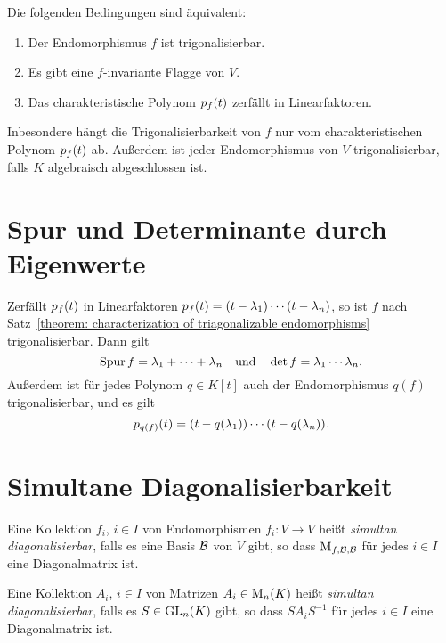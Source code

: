 \begin{theorem}
  \label{theorem: characterization of triagonalizable endomorphisms}
  Die folgenden Bedingungen sind äquivalent:
  \begin{enumerate}
    \item
      Der Endomorphismus $f$ ist trigonalisierbar.
    \item
      Es gibt eine $f$-invariante Flagge von $V$.
    \item
      Das charakteristische Polynom $p_{f}(t)$ zerfällt in Linearfaktoren.
  \end{enumerate}
\end{theorem}

Inbesondere hängt die Trigonalisierbarkeit von $f$ nur vom charakteristischen Polynom $p_{f}(t)$ ab.
Außerdem ist jeder Endomorphismus von $V$ trigonalisierbar, falls $K$ algebraisch abgeschlossen ist.



\section{Spur und Determinante durch Eigenwerte}
\label{section: trace and determinant via eigenvalues}

Zerfällt $p_{f}(t)$ in Linearfaktoren $p_{f}(t) = (t - \lambda_1) \dotsm (t - \lambda_n)$, so ist $f$ nach Satz~\ref{theorem: characterization of triagonalizable endomorphisms} trigonalisierbar.
Dann gilt
\[
    \operatorname{Spur} f
  = \lambda_1 + \dotsb + \lambda_n
\quad\text{und}\quad
    \det f
  = \lambda_1 \dotsm \lambda_n.
\]
Außerdem ist für jedes Polynom $q \in K[t]$ auch der Endomorphismus $q(f)$ trigonalisierbar, und es gilt
\[
    p_{q(f)}(t)
  = (t - q(\lambda_1)) \dotsm (t - q(\lambda_n)).
\]





\section{Simultane Diagonalisierbarkeit}

\begin{definition}
  Eine Kollektion $f_i$, $i \in I$ von Endomorphismen $f_i \colon V \to V$ heißt \emph{simultan diagonalisierbar}, falls es eine Basis $\mathcal{B}$ von $V$ gibt, so dass $\operatorname{M}_{f, \mathcal{B}, \mathcal{B}}$ für jedes $i \in I$ eine Diagonalmatrix ist.
  
  Eine Kollektion $A_i$, $i \in I$ von Matrizen $A_i \in \operatorname{M}_{n}(K)$ heißt \emph{simultan diagonalisierbar}, falls es $S \in \operatorname{GL}_{n}(K)$ gibt, so dass $S A_i S^{-1}$ für jedes $i \in I$ eine Diagonalmatrix ist.
\end{definition}

